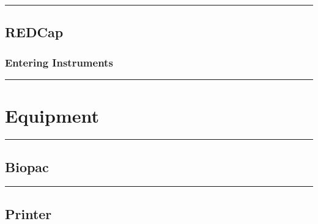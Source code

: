 \documentclass[]{book}
\begin{document}
\begin{center}\rule{0.5\linewidth}{\linethickness}\end{center}

\hypertarget{redcap}{%
\subsection{REDCap}\label{redcap}}

\hypertarget{entering-instruments}{%
\subsubsection{Entering Instruments}\label{entering-instruments}}

\begin{center}\rule{0.5\linewidth}{\linethickness}\end{center}

\hypertarget{equipment}{%
\section{Equipment}\label{equipment}}

\begin{center}\rule{0.5\linewidth}{\linethickness}\end{center}

\hypertarget{biopac}{%
\subsection{Biopac}\label{biopac}}

\begin{center}\rule{0.5\linewidth}{\linethickness}\end{center}

\hypertarget{printer}{%
\subsection{Printer}\label{printer}}
\end{document}

